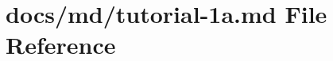 \hypertarget{tutorial-1a_8md}{}\section{docs/md/tutorial-\/1a.md File Reference}
\label{tutorial-1a_8md}
